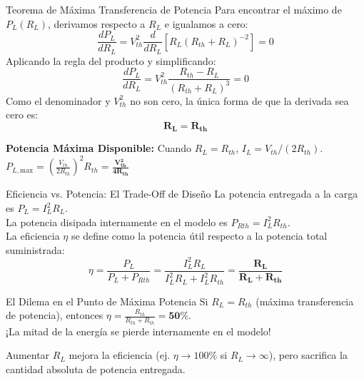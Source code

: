 \documentclass[aspectratio=169, table, xcdraw]{beamer}
\begin{document}
\begin{frame}{Teorema de Máxima Transferencia de Potencia}
    Para encontrar el máximo de $P_L(R_L)$, derivamos respecto a $R_L$ e igualamos a cero:
    \begin{equation*}
        \frac{d P_L}{d R_L} = V_{th}^2 \frac{d}{d R_L} \left[ R_L (R_{th} + R_L)^{-2} \right] = 0
    \end{equation*}
    Aplicando la regla del producto y simplificando:
    \begin{equation*}
        \frac{d P_L}{d R_L} = V_{th}^2 \frac{R_{th} - R_L}{(R_{th} + R_L)^3} = 0
    \end{equation*}
    Como el denominador y $V_{th}^2$ no son cero, la única forma de que la derivada sea cero es:
    \begin{equation*}
        \mathbf{R_L = R_{th}}
    \end{equation*}
    \begin{tcolorbox}[colback=white, colframe=ucbblue, boxrule=0.5pt, arc=1mm]
        \textbf{Potencia Máxima Disponible:} Cuando $R_L = R_{th}$, $I_L = V_{th}/(2R_{th})$. \\
        $P_{L,\text{max}} = \left( \frac{V_{th}}{2R_{th}} \right)^2 R_{th} = \mathbf{\frac{V_{th}^2}{4R_{th}}}$
    \end{tcolorbox}
\end{frame}

\begin{frame}{Eficiencia vs. Potencia: El Trade-Off de Diseño}
    La potencia entregada a la carga es $P_L = I_L^2 R_L$. \\
    La potencia disipada internamente en el modelo es $P_{Rth} = I_L^2 R_{th}$. \\
    
    \vspace{0.2cm}
    La eficiencia $\eta$ se define como la potencia útil respecto a la potencia total suministrada:
    \begin{equation*}
        \eta = \frac{P_L}{P_L + P_{Rth}} = \frac{I_L^2 R_L}{I_L^2 R_L + I_L^2 R_{th}} = \mathbf{\frac{R_L}{R_L + R_{th}}}
    \end{equation*}

    \begin{alertblock}{El Dilema en el Punto de Máxima Potencia}
        Si $R_L = R_{th}$ (máxima transferencia de potencia), entonces $\eta = \frac{R_{th}}{R_{th} + R_{th}} = \mathbf{50\%}$.\\
        ¡La mitad de la energía se pierde internamente en el modelo!
    \end{alertblock}
    Aumentar $R_L$ mejora la eficiencia (ej. $\eta \rightarrow 100\%$ si $R_L \rightarrow \infty$), pero sacrifica la cantidad absoluta de potencia entregada.
\end{frame}
\end{document}
